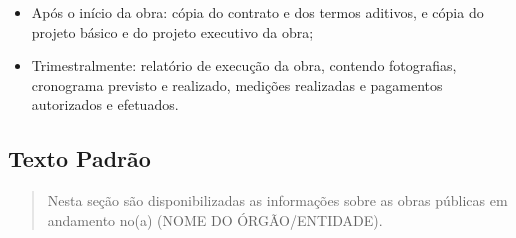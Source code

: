 \documentclass[]{book}
\providecommand{\tightlist}{%
  \setlength{\itemsep}{0pt}\setlength{\parskip}{0pt}}
\begin{document}
\begin{itemize}
\tightlist
\item
  Após o início da obra: cópia do contrato e dos termos aditivos, e cópia do projeto básico e do projeto executivo da obra;
\item
  Trimestralmente: relatório de execução da obra, contendo fotografias, cronograma previsto e realizado, medições realizadas e pagamentos autorizados e efetuados.
\end{itemize}

\hypertarget{texto-padruxe3o-4}{%
\subsection{Texto Padrão}\label{texto-padruxe3o-4}}

\begin{quote}
Nesta seção são disponibilizadas as informações sobre as obras públicas em andamento no(a) (NOME DO ÓRGÃO/ENTIDADE).
\end{quote}
\end{document}
